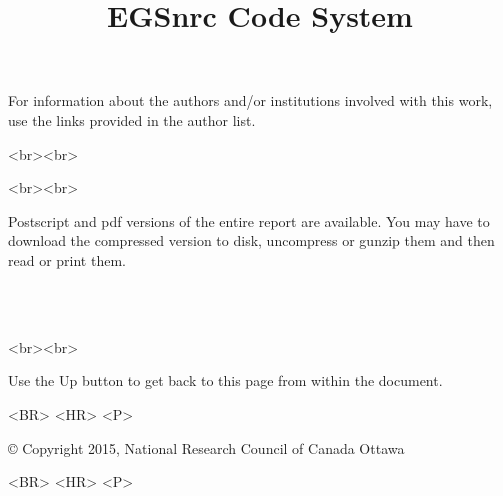 \documentclass[12pt,twoside]{article}  %
\begin{document}
\begin{htmlonly}
For information about the authors and/or institutions involved with this
work, use the links provided in the author list.\\
\begin{rawhtml}
<br><br>
\end{rawhtml}


\begin{rawhtml}
<br><br>
\end{rawhtml}

Postscript and pdf versions of the entire report are available.  You may have to
download the compressed version to disk, uncompress or gunzip them and
then read or print them.\\
\begin{center}
\\
\\
\end{center}
\begin{rawhtml}
<br><br>
\end{rawhtml}

Use the Up button to get back to this page from within the document.
\begin{rawhtml}
<BR> <HR> <P>
\end{rawhtml}
\copyright
Copyright 2015, National Research Council of Canada
Ottawa
\begin{rawhtml}
<BR> <HR> <P>
\end{rawhtml}
\end{htmlonly}

\pagestyle{empty}



\title{EGSnrc Code System}
\end{document}
